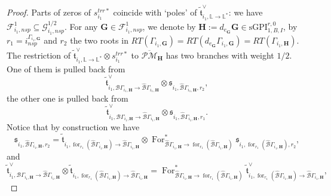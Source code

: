 \documentclass[11pt]{amsart}
\theoremstyle{definition}
\theoremstyle{remark}
\newcommand{\oPMb}{{\overline{\mathcal{PM}}}}
\newcommand{\nontilde}{}
\newcommand{\<}{\left<}
\renewcommand{\>}{\right>}
\numberwithin{equation}{section}
\def\sGPI{\text{sGPI}}
\begin{document}
\begin{proof}
        Parts of zeros of $\nontilde{s}^{trr*}_{i_1}$ coincide with `poles' of $\tilde{\mathfrak{t}}^{\vee}_{i_1,\mathbb L \to \mathbb L^*}$: we have $ \bm{\mathcal F}^1_{i_1,nsp}\subseteq \bm{\mathcal G}^{1/2}_{i_1,nsp}$. For any $\bm{G}\in \bm{\mathcal F}^1_{i_1,nsp}$, we denote by $\bm{H}:=d_{e_{\bm{G}}}\bm{G}\in \sGPI^{r,0}_{1,B,I}$, by $r_1=i^{\Gamma_{i_1,\bm{G}}}_{nsp}$ and $r_2$ the two roots in $RT(\Gamma_{i_1,\bm{G}})=RT(d_{e_{\bm{G}}}\Gamma_{i_1,\bm{G}})=RT(\Gamma_{i_1,\bm{H}})$. The restriction of $\tilde{\mathfrak{t}}^{\vee}_{i_1,\mathbb L \to \mathbb L^*}\otimes
        \nontilde{s}^{trr*}_{i_1}$ to $\oPMb_{\bm{H}}$ has two branches with weight $1/2$. One of them is pulled back from 
        \begin{equation}\label{eq one branch that zero and pole will cancel in proof}
        \tilde{\mathfrak t}^\vee_{i_1,{\mathcal B}\Gamma_{i_1,\bm{H}}\to\hat{\mathcal B}\Gamma_{i_1,\bm{H}}}\otimes \mathfrak s_{i_1,\hat{\mathcal B}\Gamma_{i_1,\bm{H}},r_2},
        \end{equation}
         the other one is pulled back from \begin{equation}\label{eq one branch that zero and pole will not cancel in the chosen strata}
        \tilde{\mathfrak t}^\vee_{i_1,{\mathcal B}\Gamma_{i_1,\bm{H}}\to\hat{\mathcal B}\Gamma_{i_1,\bm{H}}}\otimes \mathfrak s_{i_1,\hat{\mathcal B}\Gamma_{i_1,\bm{H}},r_1}.
        \end{equation}
        Notice that by construction we have 
        $$
        \mathfrak s_{i_1,\hat{\mathcal B}\Gamma_{i_1,\bm{H}},r_2}= \tilde{\mathfrak t}_{i_1,\operatorname{for}_{r_1}(\hat{\mathcal B}\Gamma_{i_1,\bm{H}}) \to \hat{\mathcal B}\Gamma_{i_1,\bm{H}}}\otimes \operatorname{For}^*_{\hat{\mathcal B}\Gamma_{i_1,\bm{H}} \to \operatorname{for}_{r_1}(\hat{\mathcal B}\Gamma_{i_1,\bm{H}})}\mathfrak s_{i_1,\operatorname{for}_{r_1}(\hat{\mathcal B}\Gamma_{i_1,\bm{H}}),r_2},
        $$
        and 
        \begin{equation*}
        \tilde{\mathfrak t}^\vee_{i_1,{\mathcal B}\Gamma_{i_1,\bm{H}}\to\hat{\mathcal B}\Gamma_{i_1,\bm{H}}} \otimes \tilde{\mathfrak t}_{i_1, \operatorname{for}_{r_1}(\hat{\mathcal B}\Gamma_{i_1,\bm{H}})\to \hat{\mathcal B}\Gamma_{i_1,\bm{H}}}
        = 
        \operatorname{For}^*_{\hat{\mathcal B}\Gamma_{i_1,\bm{H}} \to \operatorname{for}_{r_1}(\hat{\mathcal B}\Gamma_{i_1,\bm{H}})}
        \tilde{\mathfrak t}^\vee_{i_1,\operatorname{for}_{r_1}(\hat{\mathcal B}\Gamma_{i_1,\bm{H}})\to\hat{\mathcal B}\Gamma_{i_1,\bm{H}}},
        \end{equation*}

\end{proof}
\end{document}
